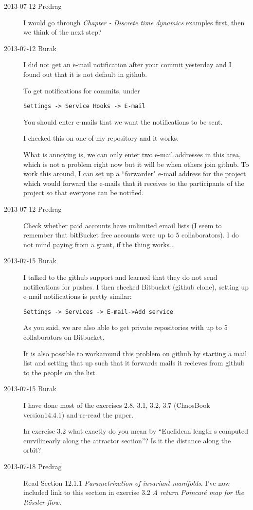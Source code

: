 \begin{description}
\item[2013-07-12  Predrag] I would go through
 {\em Chapter  - Discrete time dynamics} examples first, then
we think of the next step?

\item[2013-07-12  Burak]
I did not get an e-mail notification after your commit yesterday and I found out that it is not default in github.

To get notifications for commits, under
\begin{verbatim}
Settings -> Service Hooks -> E-mail
\end{verbatim}
You should enter e-mails that we want the notifications to be sent.

I checked this on one of my repository and it works.

What is annoying is, we can only enter two e-mail addresses in this area, which is not a problem right now but it will be when others join github. To work this around, I can set up a ``forwarder" e-mail address for the project which would forward the e-mails that it receives to the participants of the project so that everyone can be notified.
\item[2013-07-12  Predrag] Check whether paid accounts have unlimited email lists (I seem to remember that bitBucket free accounts were up to 5 collaborators). I
    do not mind paying from a grant, if the thing works...

\item[2013-07-15  Burak]
I talked to the github support and learned that they do not send notifications for pushes. I then checked Bitbucket (github clone), setting up e-mail notifications is pretty similar:
\begin{verbatim}
Settings -> Services -> E-mail->Add service
\end{verbatim}
As you said, we are also able to get private repositories with up to 5 collaborators on Bitbucket.

It is also possible to workaround this problem on github by starting a mail list and setting that up such that it forwards mails it recieves from github to the people on the list.

\item[2013-07-15  Burak]
I have done most of the exercises 2.8, 3.1, 3.2, 3.7 (ChaosBook
version14.4.1) and re-read the paper.

In exercise 3.2 what exactly do you mean by ``Euclidean length s
computed curvilinearly along the attractor section''? Is it the
distance along the orbit?
\item[2013-07-18  Predrag] Read
Section 12.1.1 {\em Parametrization of invariant manifolds}. I've now
included link to this section in exercise 3.2 {\em A return Poincar\'e map for the R\"ossler flow.}


\end{description}
